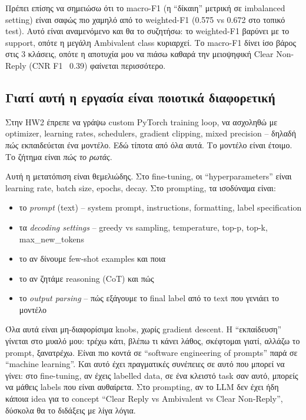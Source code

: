 \documentclass[12pt]{fphw}
\begin{document}
Πρέπει επίσης να σημειώσω ότι το macro-F1 (η ``δίκαιη'' μετρική σε imbalanced setting) είναι σαφώς πιο χαμηλό από το weighted-F1 (0.575 vs 0.672 στο τοπικό test). Αυτό είναι αναμενόμενο και θα το συζητήσω: το weighted-F1 βαρύνει με το support, οπότε η μεγάλη Ambivalent class κυριαρχεί. Το macro-F1 δίνει ίσο βάρος στις 3 κλάσεις, οπότε η αποτυχία μου να πιάσω καθαρά την μειοψηφική Clear Non-Reply (CNR F1 ~0.39) φαίνεται περισσότερο.

\subsection{Γιατί αυτή η εργασία είναι ποιοτικά διαφορετική}

Στην HW2 έπρεπε να γράψω custom PyTorch training loop, να ασχοληθώ με optimizer, learning rates, schedulers, gradient clipping, mixed precision -- δηλαδή \emph{πώς} εκπαιδεύεται ένα μοντέλο. Εδώ τίποτα από όλα αυτά. Το μοντέλο είναι έτοιμο. Το ζήτημα είναι \emph{πώς το ρωτάς}.

Αυτή η μετατόπιση είναι θεμελιώδης. Στο fine-tuning, οι ``hyperparameters'' είναι learning rate, batch size, epochs, decay. Στο prompting, τα ισοδύναμα είναι:

\begin{itemize}
    \item το \emph{prompt} (text) -- system prompt, instructions, formatting, label specification
    \item τα \emph{decoding settings} -- greedy vs sampling, temperature, top-p, top-k, max\_new\_tokens
    \item το αν δίνουμε few-shot examples και ποια
    \item το αν ζητάμε reasoning (CoT) και πώς
    \item το \emph{output parsing} -- πώς εξάγουμε το final label από το text που γενιάει το μοντέλο
\end{itemize}

Όλα αυτά είναι μη-διαφορίσιμα knobs, χωρίς gradient descent. Η ``εκπαίδευση'' γίνεται στο μυαλό μου: τρέχω κάτι, βλέπω τι κάνει λάθος, σκέφτομαι γιατί, αλλάζω το prompt, ξανατρέχω. Είναι πιο κοντά σε ``software engineering of prompts'' παρά σε ``machine learning''. Και αυτό έχει πραγματικές συνέπειες σε αυτό που μπορεί να γίνει: στο fine-tuning, αν έχεις labelled data, σε ένα κλειστό task σαν αυτό, μπορείς να μάθεις labels που είναι αυθαίρετα. Στο prompting, αν το LLM δεν έχει ήδη κάποια idea για το concept ``Clear Reply vs Ambivalent vs Clear Non-Reply'', δύσκολα θα το διδάξεις με λίγα λόγια.
\end{document}
